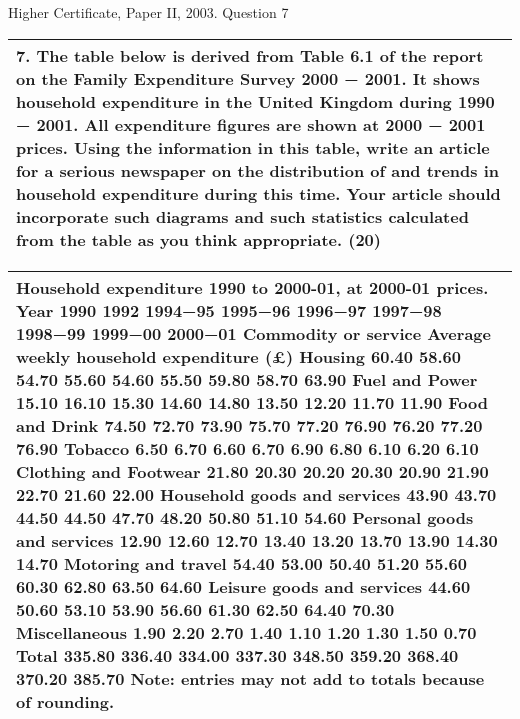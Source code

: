 \documentclass[a4paper,12pt]{article}
\begin{document}
Higher Certificate, Paper II, 2003. Question 7
\begin{table}[ht!]
 
\centering
 
\begin{tabular}{|p{15cm}|}
 
\hline  
7. The table below is derived from Table 6.1 of the report on the Family Expenditure Survey 2000 − 2001.  It shows household expenditure in the United Kingdom during 1990 − 2001.  All expenditure figures are shown at 2000 − 2001 prices.  Using the information in this table, write an article for a serious newspaper on the distribution of and trends in household expenditure during this time.  Your article should incorporate such diagrams and such statistics calculated from the table as you think appropriate. (20) 
 

\\ \hline
  
\end{tabular}

\end{table}

\newpage

\begin{table}[ht!]
 
\centering
 
\begin{tabular}{|p{15cm}|}
 
\hline   
 
Household expenditure 1990 to 2000-01, at 2000-01 prices. 
 Year 1990 1992 1994−95 1995−96 1996−97 1997−98 1998−99 1999−00 2000−01 Commodity or service Average weekly household expenditure (£) Housing 60.40 58.60 54.70 55.60 54.60 55.50 59.80 58.70 63.90 Fuel and Power 15.10 16.10 15.30 14.60 14.80 13.50 12.20 11.70 11.90 Food and Drink 74.50 72.70 73.90 75.70 77.20 76.90 76.20 77.20 76.90 Tobacco   6.50   6.70   6.60   6.70   6.90   6.80   6.10   6.20   6.10 Clothing and Footwear 21.80 20.30 20.20 20.30 20.90 21.90 22.70 21.60 22.00 Household goods and services 43.90 43.70 44.50 44.50 47.70 48.20 50.80 51.10 54.60 Personal goods and services 12.90 12.60 12.70 13.40 13.20 13.70 13.90 14.30 14.70 Motoring and travel 54.40 53.00 50.40 51.20 55.60 60.30 62.80 63.50 64.60 Leisure goods and services 44.60 50.60 53.10 53.90 56.60 61.30 62.50 64.40 70.30 Miscellaneous   1.90   2.20   2.70   1.40   1.10   1.20   1.30   1.50   0.70 Total 335.80 336.40 334.00 337.30 348.50 359.20 368.40 370.20 385.70 
 Note:  entries may not add to totals because of rounding. 

 

\\ \hline
  
\end{tabular}

\end{table}
 
\end{document}
